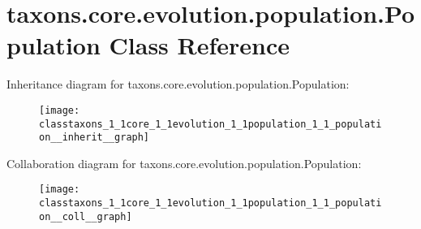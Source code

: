 \hypertarget{classtaxons_1_1core_1_1evolution_1_1population_1_1_population}{}\section{taxons.\+core.\+evolution.\+population.\+Population Class Reference}
\label{classtaxons_1_1core_1_1evolution_1_1population_1_1_population}


Inheritance diagram for taxons.\+core.\+evolution.\+population.\+Population\+:
\nopagebreak
\begin{figure}[H]
\begin{center}
\leavevmode
\texttt{[image: classtaxons\_1\_1core\_1\_1evolution\_1\_1population\_1\_1\_population\_\_inherit\_\_graph]}
\end{center}
\end{figure}


Collaboration diagram for taxons.\+core.\+evolution.\+population.\+Population\+:
\nopagebreak
\begin{figure}[H]
\begin{center}
\leavevmode
\texttt{[image: classtaxons\_1\_1core\_1\_1evolution\_1\_1population\_1\_1\_population\_\_coll\_\_graph]}
\end{center}
\end{figure}

